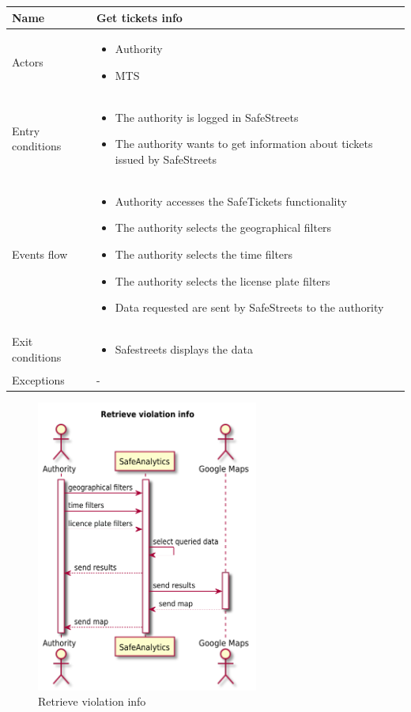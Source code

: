 \documentclass[a4paper]{article}
\begin{document}
\begin{table}[H]
\centering
\begin{tabularx}{\textwidth}{|l|X|}
\hline
Name & Get tickets info\tabularnewline
\hline
Actors &
\begin{itemize}[nosep,leftmargin=*]
\item Authority
\item MTS
\end{itemize}
\tabularnewline
\hline
Entry conditions &
\begin{itemize}[nosep,leftmargin=*]
\item The authority is logged in SafeStreets
\item The authority wants to get information about tickets issued by
SafeStreets
\end{itemize}
\tabularnewline
\hline
Events flow &
\begin{itemize}[nosep,leftmargin=*]
\item Authority accesses the SafeTickets functionality
\item The authority selects the geographical filters
\item The authority selects the time filters
\item The authority selects the license plate filters
\item Data requested are sent by SafeStreets to the authority
\end{itemize}
\tabularnewline
\hline
Exit conditions &
\begin{itemize}[nosep,leftmargin=*]
\item Safestreets displays the data
\end{itemize}
\tabularnewline
\hline
Exceptions & -\tabularnewline
\hline
\end{tabularx}
\end{table}

\begin{figure}[H]
\centering
\includegraphics[width=0.65\textwidth]{retrieve_violation_info_sequence_diagram}
\caption{Retrieve violation info}
\end{figure}
\end{document}
